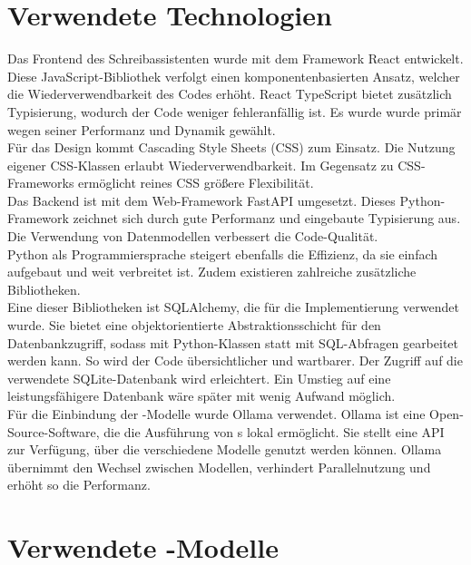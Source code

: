 \documentclass[../main.tex]{subfiles}
\begin{document}
\section{Verwendete Technologien}

Das Frontend des Schreibassistenten wurde mit dem Framework React entwickelt. Diese JavaScript-Bibliothek verfolgt einen komponentenbasierten Ansatz, welcher die Wiederverwendbarkeit 
des Codes erhöht. React TypeScript bietet zusätzlich Typisierung, wodurch der Code weniger fehleranfällig ist. Es wurde wurde primär wegen seiner Performanz und Dynamik gewählt. \cite{react1,react2} \\
Für das Design kommt Cascading Style Sheets (CSS) zum Einsatz. Die Nutzung eigener CSS-Klassen erlaubt Wiederverwendbarkeit. Im Gegensatz zu CSS-Frameworks ermöglicht reines CSS größere Flexibilität.\\
Das Backend ist mit dem Web-Framework FastAPI umgesetzt. Dieses Python-Framework zeichnet sich durch gute Performanz und eingebaute Typisierung aus. Die Verwendung von Datenmodellen verbessert die Code-Qualität\cite{fastapi}.\\
Python als Programmiersprache steigert ebenfalls die Effizienz, da sie einfach aufgebaut und weit verbreitet ist. Zudem existieren zahlreiche zusätzliche Bibliotheken.\cite{python}\\
Eine dieser Bibliotheken ist SQLAlchemy, die für die Implementierung verwendet wurde. Sie bietet eine objektorientierte Abstraktionsschicht für den Datenbankzugriff, sodass mit Python-Klassen statt mit SQL-Abfragen gearbeitet werden kann. 
So wird der Code übersichtlicher und wartbarer. Der Zugriff auf die verwendete SQLite-Datenbank wird erleichtert. Ein Umstieg auf eine leistungsfähigere Datenbank wäre später mit wenig Aufwand möglich.\cite{SQLAlchemy}\\
Für die Einbindung der -Modelle wurde Ollama verwendet. Ollama ist eine Open-Source-Software, die die Ausführung von s lokal ermöglicht. 
Sie stellt eine API zur Verfügung, über die verschiedene Modelle genutzt werden können. Ollama übernimmt den Wechsel zwischen Modellen, verhindert Parallelnutzung und erhöht so die Performanz.\cite{ollamaSchreibassi,ollamaTechnologie}



\section{Verwendete -Modelle} \label{sec:kiModelle}
\end{document}
